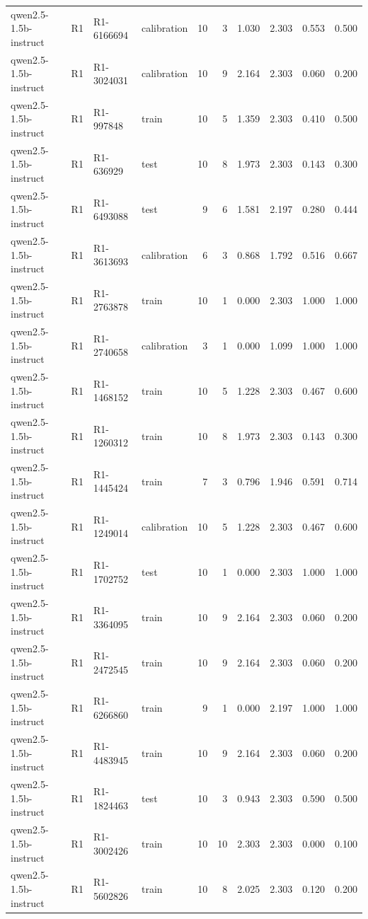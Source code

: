 \begin{table}
\begin{tabular}{llllrrrrrr}
qwen2.5-1.5b-instruct & R1 & R1-6166694 & calibration & 10 & 3 & 1.030 & 2.303 & 0.553 & 0.500 \\
qwen2.5-1.5b-instruct & R1 & R1-3024031 & calibration & 10 & 9 & 2.164 & 2.303 & 0.060 & 0.200 \\
qwen2.5-1.5b-instruct & R1 & R1-997848 & train & 10 & 5 & 1.359 & 2.303 & 0.410 & 0.500 \\
qwen2.5-1.5b-instruct & R1 & R1-636929 & test & 10 & 8 & 1.973 & 2.303 & 0.143 & 0.300 \\
qwen2.5-1.5b-instruct & R1 & R1-6493088 & test & 9 & 6 & 1.581 & 2.197 & 0.280 & 0.444 \\
qwen2.5-1.5b-instruct & R1 & R1-3613693 & calibration & 6 & 3 & 0.868 & 1.792 & 0.516 & 0.667 \\
qwen2.5-1.5b-instruct & R1 & R1-2763878 & train & 10 & 1 & 0.000 & 2.303 & 1.000 & 1.000 \\
qwen2.5-1.5b-instruct & R1 & R1-2740658 & calibration & 3 & 1 & 0.000 & 1.099 & 1.000 & 1.000 \\
qwen2.5-1.5b-instruct & R1 & R1-1468152 & train & 10 & 5 & 1.228 & 2.303 & 0.467 & 0.600 \\
qwen2.5-1.5b-instruct & R1 & R1-1260312 & train & 10 & 8 & 1.973 & 2.303 & 0.143 & 0.300 \\
qwen2.5-1.5b-instruct & R1 & R1-1445424 & train & 7 & 3 & 0.796 & 1.946 & 0.591 & 0.714 \\
qwen2.5-1.5b-instruct & R1 & R1-1249014 & calibration & 10 & 5 & 1.228 & 2.303 & 0.467 & 0.600 \\
qwen2.5-1.5b-instruct & R1 & R1-1702752 & test & 10 & 1 & 0.000 & 2.303 & 1.000 & 1.000 \\
qwen2.5-1.5b-instruct & R1 & R1-3364095 & train & 10 & 9 & 2.164 & 2.303 & 0.060 & 0.200 \\
qwen2.5-1.5b-instruct & R1 & R1-2472545 & train & 10 & 9 & 2.164 & 2.303 & 0.060 & 0.200 \\
qwen2.5-1.5b-instruct & R1 & R1-6266860 & train & 9 & 1 & 0.000 & 2.197 & 1.000 & 1.000 \\
qwen2.5-1.5b-instruct & R1 & R1-4483945 & train & 10 & 9 & 2.164 & 2.303 & 0.060 & 0.200 \\
qwen2.5-1.5b-instruct & R1 & R1-1824463 & test & 10 & 3 & 0.943 & 2.303 & 0.590 & 0.500 \\
qwen2.5-1.5b-instruct & R1 & R1-3002426 & train & 10 & 10 & 2.303 & 2.303 & 0.000 & 0.100 \\
qwen2.5-1.5b-instruct & R1 & R1-5602826 & train & 10 & 8 & 2.025 & 2.303 & 0.120 & 0.200 \\

\end{tabular}
\end{table}
